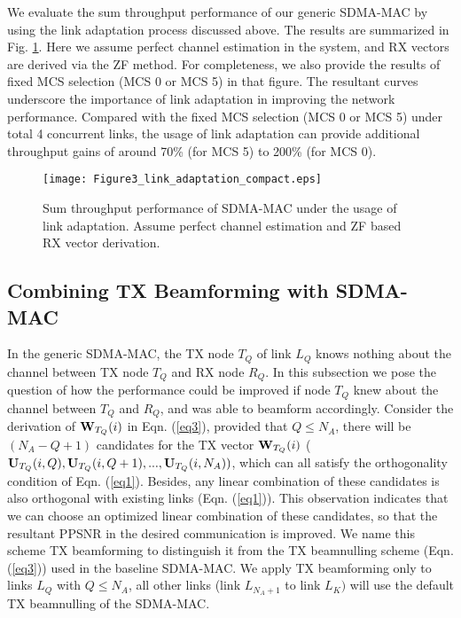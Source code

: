 \documentclass[journal, final]{IEEEtran}
\begin{document}
We evaluate the sum throughput performance of our generic SDMA-MAC by using
the link adaptation process discussed above. The results are summarized in
Fig. \ref{Fig3_link_adaptation}. Here we assume perfect channel estimation in the system, and RX
vectors are derived via the ZF method. For completeness, we also provide the
results of fixed MCS selection (MCS 0 or MCS 5) in that figure. The
resultant curves underscore the importance of link adaptation in improving
the network performance. Compared with the fixed MCS selection (MCS 0 or MCS
5) under total 4 concurrent links, the usage of link adaptation can provide
additional throughput gains of around 70{\%} (for MCS 5) to 200{\%} (for MCS
0).

\begin{figure}
\centering
\texttt{[image: Figure3\_link\_adaptation\_compact.eps]}
\caption{Sum throughput performance of SDMA-MAC under the usage of link adaptation. Assume perfect channel estimation and ZF based RX vector derivation.}
\label{Fig3_link_adaptation}
\end{figure}

\subsection{Combining TX Beamforming with SDMA-MAC}

In the generic SDMA-MAC, the TX node $T_Q $ of link $L_Q $ knows nothing
about the channel between TX node $T_Q $ and RX node $R_Q $. In this
subsection we pose the question of how the performance could be improved if
node $T_Q $ knew about the channel between $T_Q $ and $R_Q $, and was able
to beamform accordingly. Consider the derivation of ${\rm {\bf W}}_{T_Q } (i)$ in Eqn. (\ref{eq3}),
provided that $Q \le N_A $, there will be $(N_A - Q + 1)$ candidates for the
TX vector ${\rm {\bf W}}_{T_Q } (i)$ (${\rm {\bf U}}_{T_Q } (i,Q),{\rm {\bf
U}}_{T_Q } (i,Q + 1),...,{\rm {\bf U}}_{T_Q } (i,N_A ))$, which can all
satisfy the orthogonality condition of Eqn. (\ref{eq1}). Besides, any linear
combination of these candidates is also orthogonal with existing links (Eqn.
(\ref{eq1})). This observation indicates that we can choose an optimized linear
combination of these candidates, so that the resultant PPSNR in the desired
communication is improved. We name this scheme TX beamforming to distinguish
it from the TX beamnulling scheme (Eqn. (\ref{eq3})) used in the baseline SDMA-MAC. We apply TX
beamforming only to links $L_Q $ with $Q \le N_A $, all other links (link
$L_{N_A + 1} $ to link $L_K )$ will use the default TX beamnulling of the
SDMA-MAC.
\end{document}
